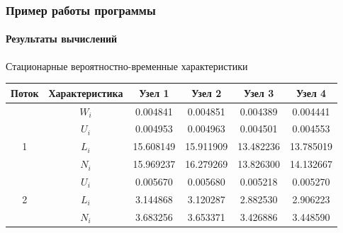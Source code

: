 \documentclass[aspectratio=169]{beamer}
\begin{document}
\begin{frame}
\frametitle{Пример работы программы}
\framesubtitle{Результаты вычислений}

\begin{block}{Стационарные вероятностно-временные характеристики}
\begin{tabular}{|c|c|c|c|c|c|}
\hline Поток & Характеристика & Узел 1 & Узел 2 & Узел 3 & Узел 4 \\
\hline \cellcolor{black} 	& \( W_{i} \) & 0.004841 & 0.004851 & 0.004389 & 0.004441 \\

\hline \multirow{3}{*}{1} 	& \( U_{i} \) & 0.004953 & 0.004963 & 0.004501 & 0.004553 \\
\hhline{~-----} 				& \( L_{i} \) & 15.608149 & 15.911909 & 13.482236 & 13.785019 \\
\hhline{~-----}				& \( N_{i} \) & 15.969237 & 16.279269 & 13.826300 & 14.132667 \\

\hline \multirow{3}{*}{2} 	& \( U_{i} \) & 0.005670 & 0.005680 & 0.005218 & 0.005270 \\
\hhline{~-----} 				& \( L_{i} \) & 3.144868 & 3.120287 & 2.882530 & 2.906223 \\
\hhline{~-----}				& \( N_{i} \) & 3.683256 & 3.653371 & 3.426886 & 3.448590 \\
\hline
\end{tabular}
\end{block}
\end{frame}
\end{document}
